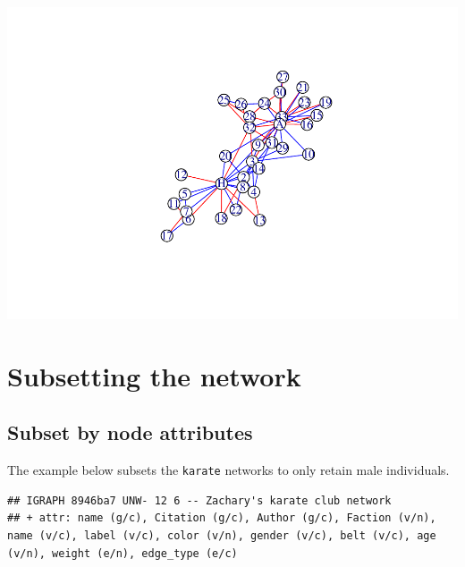 \documentclass[
]{book}
\newenvironment{Shaded}{\begin{snugshade}}{\end{snugshade}}
\newcommand{\AttributeTok}[1]{\textcolor[rgb]{0.13,0.29,0.53}{#1}}
\newcommand{\FunctionTok}[1]{\textcolor[rgb]{0.13,0.29,0.53}{\textbf{#1}}}
\newcommand{\NormalTok}[1]{#1}
\newcommand{\OtherTok}[1]{\textcolor[rgb]{0.56,0.35,0.01}{#1}}
\newcommand{\SpecialCharTok}[1]{\textcolor[rgb]{0.81,0.36,0.00}{\textbf{#1}}}
\newcommand{\StringTok}[1]{\textcolor[rgb]{0.31,0.60,0.02}{#1}}
\begin{document}
\includegraphics{bookdown-demo_files/figure-latex/unnamed-chunk-88-2.pdf}

\section{Subsetting the network}\label{subsetting-the-network}

\subsection{Subset by node attributes}\label{subset-by-node-attributes}

The example below subsets the \texttt{karate} networks to only retain male individuals.

\begin{Shaded}
\end{Shaded}

\begin{verbatim}
## IGRAPH 8946ba7 UNW- 12 6 -- Zachary's karate club network
## + attr: name (g/c), Citation (g/c), Author (g/c), Faction (v/n), name (v/c), label (v/c), color (v/n), gender (v/c), belt (v/c), age (v/n), weight (e/n), edge_type (e/c)
\end{verbatim}
\end{document}
